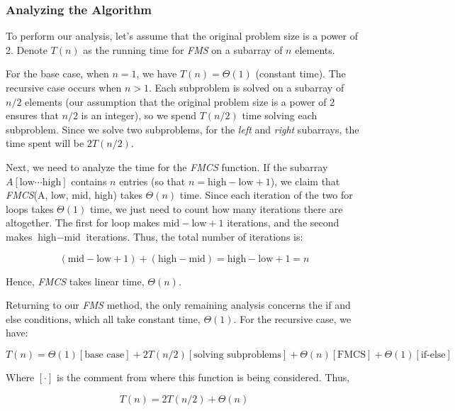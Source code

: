 \documentclass[a4paper,10pt]{article}
\begin{document}
\subsubsection{Analyzing the Algorithm}

To perform our analysis, let's assume that the original problem size is a power of 2. Denote $T(n)$ as the running time for \textit{FMS} on a subarray of $n$ elements.

For the base case, when $n = 1$, we have $T(n) = \Theta(1)$ (constant time). The recursive case occurs when $n > 1$. Each subproblem is solved on a subarray of $n/2$ elements (our assumption that the original problem size is a power of 2 ensures that $n/2$ is an integer), so we spend $T(n/2)$ time solving each subproblem. Since we solve two subproblems, for the \textit{left} and \textit{right} subarrays, the time spent will be $2T(n/2)$.

Next, we need to analyze the time for the \textit{FMCS} function. If the subarray $A[\text{low} \cdots \text{high}]$ contains $n$ entries (so that $n = \text{high} - \text{low} + 1$), we claim that \textit{FMCS}(A, low, mid, high) takes $\Theta(n)$ time. Since each iteration of the two for loops takes $\Theta(1)$ time, we just need to count how many iterations there are altogether. The first for loop makes $\text{mid} - \text{low} + 1$ iterations, and the second makes $\text{high} - \text{mid}$ iterations. Thus, the total number of iterations is:

\begin{equation}
(\text{mid} - \text{low} + 1) + (\text{high} - \text{mid}) = \text{high} - \text{low} + 1 = n
\end{equation}

Hence, \textit{FMCS} takes linear time, $\Theta(n)$.

Returning to our \textit{FMS} method, the only remaining analysis concerns the if and else conditions, which all take constant time, $\Theta(1)$. For the recursive case, we have:

\begin{equation}
    T(n) = \Theta(1) [\text{base case}] + 2T(n/2) [\text{solving subproblems}] + \Theta(n) [\text{FMCS}] + \Theta(1) [\text{if-else}]
\end{equation}

Where $[\cdot]$ is the comment from where this function is being considered. Thus,

\begin{equation}
    T(n) = 2T(n/2) + \Theta(n)
\end{equation}
\end{document}
